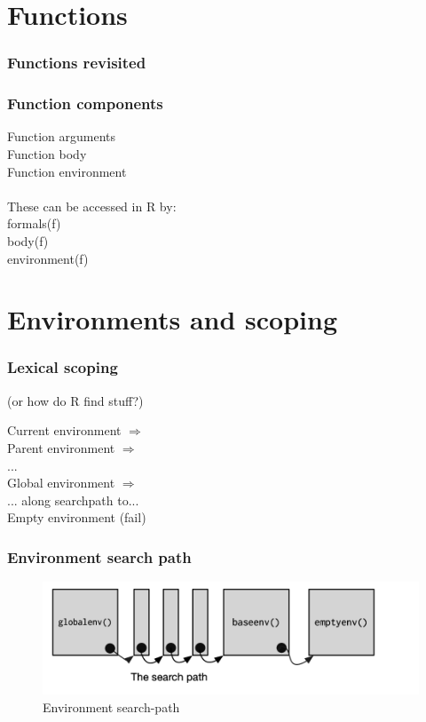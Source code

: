 \documentclass{beamer}
\begin{document}
\section{Functions}


\begin{frame}
	\frametitle{Functions revisited}
	\lstFun
\end{frame}

\begin{frame}
	\frametitle{Function components}
	Function arguments \\
	Function body \\
	Function environment \\~\\

	These can be accessed in R by: \\
	formals(f) \\
	body(f) \\
	environment(f)	
\end{frame}


\section{Environments and scoping}

\begin{frame}
	\frametitle{Lexical scoping}
	\centerline{(or how do R find stuff?)}
	\begin{center}
		Current environment $\Rightarrow$ \\
		Parent environment $\Rightarrow$ \\
		... \\
		Global environment $\Rightarrow$ \\
		... along searchpath to... \\
		Empty environment (fail)
	\end{center}
\end{frame}

\begin{frame}
	\frametitle{Environment search path}
	\begin{figure}[!ht]
		\includegraphics[scale=0.90]{figures/search-path}
		\caption{Environment search-path}
		\label{fig:enviii}
	\end{figure}
\end{frame}
\end{document}
